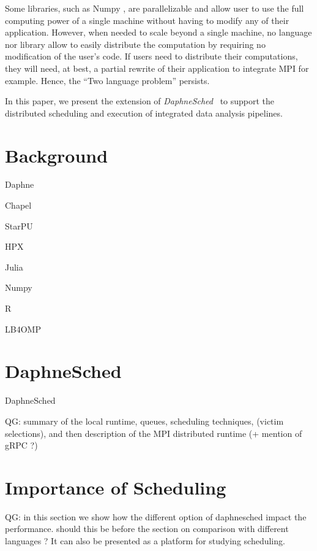 \documentclass[conference,10pt,a4paper]{IEEEtran}
\newcommand{\ds}{\emph{DaphneSched}}
\newcommand{\qg}[1]{{\color{blue} QG: #1}} %
\begin{document}
Some libraries, such as Numpy \cite{harris2020array}, are parallelizable and allow user to use the full computing power of a single machine without having to modify any of their application.
However, when needed to scale beyond a single machine, no language nor library allow to easily distribute the computation by requiring no modification of the user's code.
If users need to distribute their computations, they will need, at best, a partial rewrite of their application to integrate MPI for example.
Hence, the ``Two language problem'' persists.

In this paper, we present the extension of \ds\ \cite{eleliemy2023daphnesched} to support the distributed scheduling and execution of integrated data analysis pipelines.



\section{Background}

Daphne \cite{damme2022daphne}

Chapel \cite{callahan2004cascade}

StarPU \cite{augonnet2009starpu} 

HPX \cite{kaiser2014hpx}

Julia \cite{bezanson2012julia}

Numpy \cite{harris2020array}

R \cite{morandat2012evaluating}

LB4OMP \cite{korndorfer2021lb4omp}

\section{DaphneSched}

DaphneSched \cite{eleliemy2023daphnesched}

\qg{summary of the local runtime, queues, scheduling techniques, (victim selections), and then description of the MPI distributed runtime (+ mention of gRPC ?)}

\section{Importance of Scheduling}

\qg{in this section we show how the different option of daphnesched impact the performance. should this be before the section on comparison with different languages ?
It can also be presented as a platform for studying scheduling.
}
\end{document}
